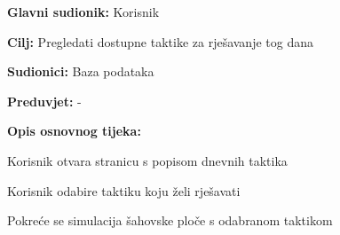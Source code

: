 					\noindent {}
					\begin{packed_item}
	
						\item \textbf{Glavni sudionik: }Korisnik
						\item  \textbf{Cilj: } Pregledati dostupne taktike za rješavanje tog dana
						\item  \textbf{Sudionici: } Baza podataka
						\item  \textbf{Preduvjet: } -
						\item  \textbf{Opis osnovnog tijeka:}
						
						\item[] \begin{packed_enum}
	
							\item Korisnik otvara stranicu s popisom dnevnih taktika
							\item Korisnik odabire taktiku koju želi rješavati
							\item Pokreće se simulacija šahovske ploče s odabranom taktikom
							
						\end{packed_enum}
					\end{packed_item}


